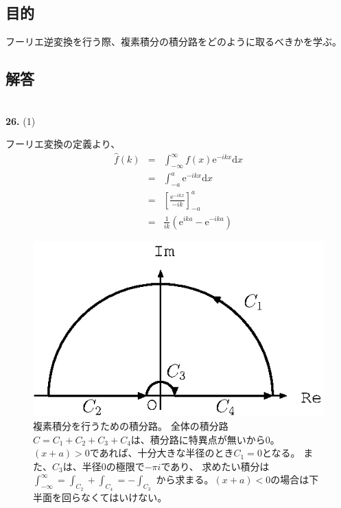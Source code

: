 \documentclass{jarticle}
\newcommand{\diff}{\mathrm d}
\newcommand{\ans}[2]{\noindent\\ {\bf \large #1.} (#2)}
\newcommand{\e}{\mathrm e}
\begin{document}
\subsection{目的}

フーリエ逆変換を行う際、複素積分の積分路をどのように取るべきかを学ぶ。

\subsection{解答}

\ans{26}{1}

フーリエ変換の定義より、
\begin{eqnarray}
  \hat{f}(k) &=& \int_{-\infty}^{\infty} f(x) \e^{-ikx} \diff x \\
  &=& \int_{-a}^{a} \e^{-ikx} \diff x \\
  &=& \left[ \frac{\e^{-ikx}}{-ik}  \right]_{-a}^a\\
  &=& \frac{1}{ik} \left( \e^{ika} - \e^{-ika} \right)
\end{eqnarray}

\begin{figure}[htbp]
  \begin{center}
    \includegraphics[width=.5\linewidth]{fig/jordan2.eps}
  \end{center}
  \caption{
    複素積分を行うための積分路。
    全体の積分路$C = C_1+C_2+C_3+C_4$は、積分路に特異点が無いから$0$。
    $(x+a)>0$であれば、十分大きな半径のとき$C_1=0$となる。
    また、$C_3$は、半径$0$の極限で$-\pi i $であり、
    求めたい積分は
    $
      \int_{-\infty}^{\infty} = \int_{C_2}+\int_{C_4} = -\int_{C_3}
    $
    から求まる。$(x+a)<0$の場合は下半面を回らなくてはいけない。
  }
  \label{fig_jordan2}
\end{figure}
\end{document}
